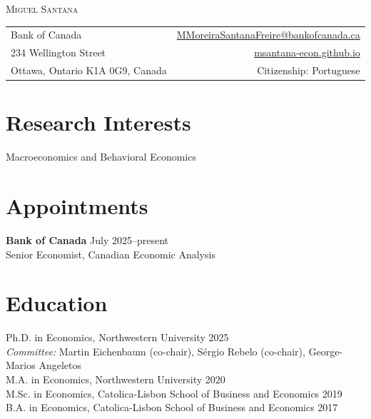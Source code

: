 \documentclass[11pt]{article}
\begin{document}
\begin{center}
  {\LARGE\scshape Miguel Santana}
\end{center}
\vspace{2pt}

\noindent\begin{tabularx}{\textwidth}{@{}Xr@{}}
Bank of Canada                  & \href{mailto:MMoreiraSantanaFreire@bankofcanada.ca}{MMoreiraSantanaFreire@bankofcanada.ca} \\
234 Wellington Street           & \href{https://msantana-econ.github.io}{msantana-econ.github.io} \\
Ottawa, Ontario K1A 0G9, Canada & Citizenship: Portuguese \\
\end{tabularx}

\section{Research Interests}
Macroeconomics and Behavioral Economics

\section{Appointments}
\noindent
\textbf{Bank of Canada} \hfill July 2025--present \\
\hspace*{1.4em} Senior Economist, Canadian Economic Analysis

\section{Education}
\noindent
Ph.D. in Economics, Northwestern University \hfill 2025 \\
\hspace*{1.4em}\textit{Committee:} Martin Eichenbaum (co-chair), Sérgio Rebelo (co-chair), George-Marios Angeletos \\[3pt]
M.A. in Economics, Northwestern University \hfill 2020 \\
M.Sc. in Economics, Catolica-Lisbon School of Business and Economics \hfill 2019 \\
B.A. in Economics, Catolica-Lisbon School of Business and Economics \hfill 2017
\end{document}

